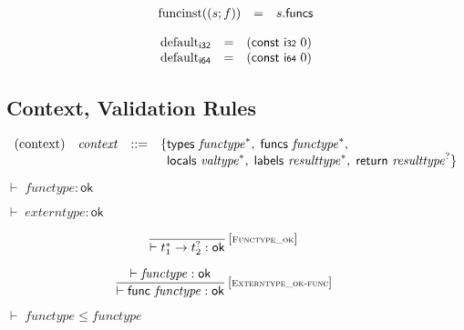 \documentclass{article}
\begin{document}
$$
\begin{array}{@{}lcl@{}l@{}}
	{\mathrm{funcinst}}((s ; f)) &=& s{.}\mathsf{funcs} \\
\end{array}
$$

$$
\begin{array}{@{}lcl@{}l@{}}
	{{\mathrm{default}}}_{\mathsf{i{\scriptstyle 32}}} &=& (\mathsf{const}~\mathsf{i{\scriptstyle 32}}~0) \\
	{{\mathrm{default}}}_{\mathsf{i{\scriptstyle 64}}} &=& (\mathsf{const}~\mathsf{i{\scriptstyle 64}}~0) \\
\end{array}
$$
\subsection{Context, Validation Rules}
$$
\begin{array}{@{}lrrl@{}l@{}}
	\mbox{(context)} & {\mathit{context}} &::=& \{ \begin{array}[t]{@{}l@{}l@{}}
		\mathsf{types}~{{\mathit{functype}}^\ast},\; \mathsf{funcs}~{{\mathit{functype}}^\ast},\; \\
		\mathsf{locals}~{{\mathit{valtype}}^\ast},\; \mathsf{labels}~{{\mathit{resulttype}}^\ast},\; \mathsf{return}~{{\mathit{resulttype}}^?} \}\end{array} \\
\end{array}
$$

\vspace{1ex}

$\boxed{{ \vdash }\;{\mathit{functype}} : \mathsf{ok}}$

$\boxed{{ \vdash }\;{\mathit{externtype}} : \mathsf{ok}}$

$$
\begin{array}{@{}c@{}}\displaystyle
	\frac{
	}{
		{ \vdash }\;{t_1^\ast} \rightarrow {t_2^?} : \mathsf{ok}
	} \, {[\textsc{\scriptsize Functype\_ok}]}
	\qquad
\end{array}
$$

$$
\begin{array}{@{}c@{}}\displaystyle
	\frac{
		{ \vdash }\;{\mathit{functype}} : \mathsf{ok}
	}{
		{ \vdash }\;\mathsf{func}~{\mathit{functype}} : \mathsf{ok}
	} \, {[\textsc{\scriptsize Externtype\_ok{-}func}]}
	\qquad
\end{array}
$$

\vspace{1ex}

$\boxed{{ \vdash }\;{\mathit{functype}} \leq {\mathit{functype}}}$
\end{document}

